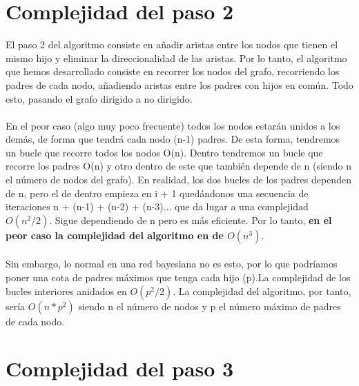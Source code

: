 \documentclass[a4paper,12pt]{article}
\begin{document}
\section{Complejidad del paso 2}
El paso 2 del algoritmo consiste en añadir aristas entre los nodos que tienen el mismo hijo y eliminar la direccionalidad de las aristas. Por lo tanto, el algoritmo que hemos desarrollado consiste en recorrer los nodos del grafo, recorriendo los padres de cada nodo, añadiendo aristas entre los padres con hijos en común. Todo esto, pasando el grafo dirigido a no dirigido. \\ \\
En el peor caso (algo muy poco frecuente) todos los nodos estarán unidos a los demás, de forma que tendrá cada nodo (n-1) padres. De esta forma, tendremos un bucle que recorre todos los nodos O(n). Dentro tendremos un bucle que recorre los padres O(n) y otro dentro de este que también depende de n (siendo n el número de nodos del grafo). En realidad, los dos bucles de los padres dependen de n, pero el de dentro empieza en i + 1 quedándonos una secuencia de iteraciones n + (n-1) + (n-2) + (n-3)... que da lugar a una complejidad $O(n^2/2)$. Sigue dependiendo de n pero es más eficiente. Por lo tanto, \textbf{en el peor caso la complejidad del algoritmo en de $O(n^3)$}. \\ \\ 
Sin embargo, lo normal en una red bayesiana no es esto, por lo que podríamos poner una cota de padres máximos que tenga cada hijo (p).La complejidad de los bucles interiores anidados en $O(p^2/2)$. La complejidad del algoritmo, por tanto, sería $O(n * p^2)$ siendo n el número de nodos y p el número máximo de padres de cada nodo.
 
\section{Complejidad del paso 3}
\end{document}
